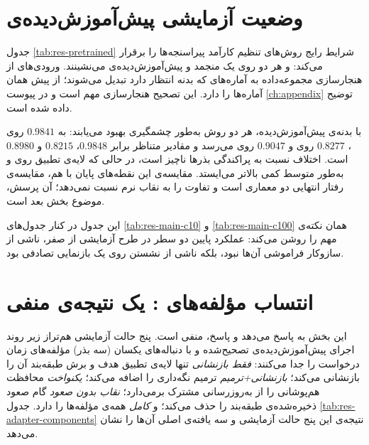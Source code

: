 \section{وضعیت آزمایشی پیش‌آموزش‌دیده‌ی }
\label{sec:res-pretrained}

جدول \ref{tab:res-pretrained} شرایط رایج روش‌های تنظیم کارآمد پیراسنجه‌ها را برقرار می‌کند:  و  هر دو روی یک  منجمد و پیش‌آموزش‌دیده‌ی  می‌نشینند. ورودی‌های  از هنجارسازی مجموعه‌داده به آماره‌های  که بدنه انتظار دارد تبدیل می‌شوند؛  از پیش همان آماره‌ها را دارد. این تصحیح هنجارسازی مهم است و در پیوست \ref{ch:appendix} توضیح داده شده است.



با بدنه‌ی پیش‌آموزش‌دیده، هر دو روش به‌طور چشمگیری بهبود می‌یابند:  به $0.9841$ روی ، $0.8277$ روی  و $0.9047$ روی  می‌رسد و مقادیر متناظر  برابر $0.9848$، $0.8215$ و $0.8980$ است. اختلاف  نسبت به پراکندگی بذرها ناچیز است، در حالی که لایه‌ی تطبیق روی  و  به‌طور متوسط کمی بالاتر می‌ایستد. مقایسه‌ی این نقطه‌های پایان با هم، مقایسه‌ی رفتار انتهایی دو معماری است و تفاوت را به نقاب نرم نسبت نمی‌دهد؛ آن پرسش، موضوع بخش بعد است.

این جدول در کنار جدول‌های \ref{tab:res-main-c10} و \ref{tab:res-main-c100} همان نکته‌ی مهم را روشن می‌کند: عملکرد پایین دو سطر  در طرح آزمایشی از صفر، ناشی از سازوکار فراموشی آن‌ها نبود، بلکه ناشی از نشستن روی یک بازنمایی تصادفی بود.

\section{انتساب مؤلفه‌های : یک نتیجه‌ی منفی}
\label{subsec:res-adapter-components}

این بخش به  پاسخ می‌دهد و پاسخ، منفی است. پنج حالت آزمایشی هم‌تراز زیر روند اجرای پیش‌آموزش‌دیده‌ی تصحیح‌شده و با دنباله‌های یکسان (سه بذر) مؤلفه‌های زمان درخواست را جدا می‌کنند: \emph{فقط بازنشانی} تنها لایه‌ی تطبیق هدف و برش طبقه‌بند آن را بازنشانی می‌کند؛ \emph{بازنشانی+ترمیم} ترمیم نگه‌داری را اضافه می‌کند؛ \emph{یکنواخت} محافظت هم‌پوشانی را از به‌روزرسانی مشترک برمی‌دارد؛ \emph{نقاب بدون صعود} گام صعود ذخیره‌شده‌ی طبقه‌بند را حذف می‌کند؛ و \emph{کامل} همه‌ی مؤلفه‌ها را دارد. جدول \ref{tab:res-adapter-components} نتیجه‌ی این پنج حالت آزمایشی و سه یافته‌ی اصلی آن‌ها را نشان می‌دهد.

